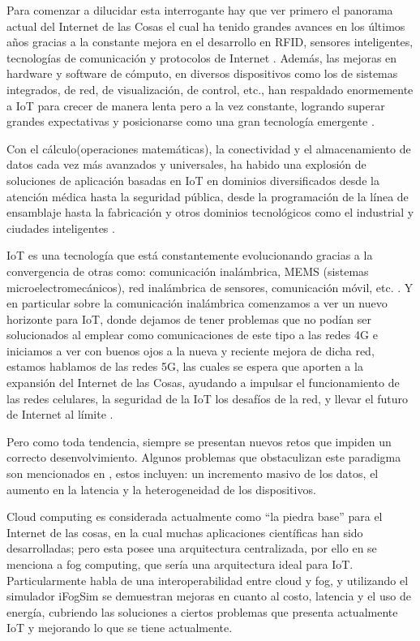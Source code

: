\vskip 0.8cm
Para comenzar a dilucidar esta interrogante hay que ver primero el panorama actual del Internet de las Cosas el cual ha tenido grandes avances en los últimos años gracias a la constante mejora en el desarrollo en RFID, sensores inteligentes, tecnologías de comunicación y protocolos de Internet \citep{alfuqaha2015,borgia2014}. Además, las mejoras en hardware y software de cómputo, en diversos dispositivos como los de sistemas integrados, de red, de visualización, de control, etc., han respaldado enormemente a IoT para crecer de manera lenta pero a la vez constante, logrando superar grandes expectativas y posicionarse como una gran tecnología emergente \citep{vyas2017}.\par
\vskip 0.3cm
Con el cálculo(operaciones matemáticas), la conectividad y el almacenamiento de datos cada vez más avanzados y universales, ha habido una explosión de soluciones de aplicación basadas en IoT en dominios diversificados desde la atención médica hasta la seguridad pública, desde la programación de la línea de ensamblaje hasta la fabricación y otros dominios tecnológicos como el industrial y ciudades inteligentes \citep{borgia2014,vyas2017}.\par
\vskip 0.3cm
IoT es una tecnología que está constantemente evolucionando gracias a la convergencia de otras como: comunicación inalámbrica, MEMS (sistemas microelectromecánicos), red inalámbrica de sensores, comunicación móvil, etc. \citep{vyas2017}. Y en particular sobre la comunicación inalámbrica comenzamos a ver un nuevo horizonte para IoT, donde dejamos de tener problemas que no podían ser solucionados al emplear como comunicaciones de este tipo a las redes 4G e iniciamos a ver con buenos ojos a la nueva y reciente mejora de dicha red, estamos hablamos de las redes 5G, las cuales se espera que aporten a la expansión del Internet de las Cosas, ayudando a impulsar el funcionamiento de las redes celulares, la seguridad de la IoT los desafíos de la red, y llevar el futuro de Internet al límite \citep{li2018}.\par
\vskip 0.3cm
Pero como toda tendencia, siempre se presentan nuevos retos que impiden un correcto desenvolvimiento. Algunos problemas que obstaculizan este paradigma son mencionados en \citep{borgia2014,ibrahim2015,mahumd2018}, estos incluyen: un incremento masivo de los datos, el aumento en la latencia y la heterogeneidad de los dispositivos.\par
\vskip 0.3cm
Cloud computing \citep{ibrahim2015} es considerada actualmente como “la piedra base” para el Internet de las cosas, en la cual muchas aplicaciones científicas han sido desarrolladas; pero esta posee una arquitectura centralizada, por ello en \citep{mahumd2018,patel2018,yi2015} se menciona a fog computing, que sería una arquitectura ideal para IoT. Particularmente \citep{mahumd2018} habla de una interoperabilidad entre cloud y fog, y utilizando el simulador iFogSim se demuestran mejoras en cuanto al costo, latencia y el uso de energía, cubriendo las soluciones a ciertos problemas que presenta actualmente IoT y mejorando lo que se tiene actualmente.\par
